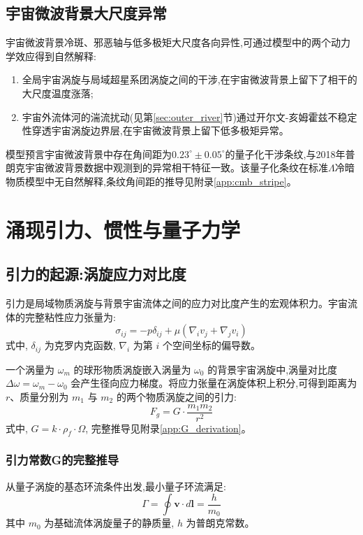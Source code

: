 \documentclass[11pt,a4paper]{article}
\def\grad{\nabla}
\begin{document}
\subsection{宇宙微波背景大尺度异常}
宇宙微波背景冷斑、邪恶轴与低多极矩大尺度各向异性,可通过模型中的两个动力学效应得到自然解释:
\begin{enumerate}
\item 全局宇宙涡旋与局域超星系团涡旋之间的干涉,在宇宙微波背景上留下了相干的大尺度温度涨落;
\item 宇宙外流体河的湍流扰动(见第\ref{sec:outer_river}节)通过开尔文-亥姆霍兹不稳定性穿透宇宙涡旋边界层,在宇宙微波背景上留下低多极矩异常。
\end{enumerate}

模型预言宇宙微波背景中存在角间距为$0.23^\circ\pm0.05^\circ$的量子化干涉条纹,与2018年普朗克宇宙微波背景数据中观测到的异常相干特征一致\cite{planck2019vi}。该量子化条纹在标准$\Lambda$冷暗物质模型中无自然解释,条纹角间距的推导见附录\ref{app:cmb_stripe}。

\section{涌现引力、惯性与量子力学}
\label{sec:gravity_origin}
\subsection{引力的起源:涡旋应力对比度}
引力是局域物质涡旋与背景宇宙流体之间的应力对比度产生的宏观体积力。宇宙流体的完整粘性应力张量为:
\begin{equation}
\sigma_{ij} = -p \delta_{ij} + \mu \left( \grad_i v_j + \grad_j v_i \right)
\end{equation}
式中, $\delta_{ij}$ 为克罗内克函数, $\grad_i$ 为第 $i$ 个空间坐标的偏导数。

一个涡量为 $\omega_m$ 的球形物质涡旋嵌入涡量为 $\omega_0$ 的背景宇宙涡旋中,涡量对比度 $\Delta\omega = \omega_m - \omega_0$ 会产生径向应力梯度。将应力张量在涡旋体积上积分,可得到距离为 $r$、质量分别为 $m_1$ 与 $m_2$ 的两个物质涡旋之间的引力:
\begin{equation}
F_g = G \cdot \frac{m_1 m_2}{r^2}
\end{equation}
式中, $G = k \cdot \rho_f \cdot \Omega$, 完整推导见附录\ref{app:G_derivation}。

\subsubsection{引力常数G的完整推导}
从量子涡旋的基态环流条件出发,最小量子环流满足:
\begin{equation}
\Gamma = \oint \boldsymbol{v} \cdot d\boldsymbol{l} = \frac{h}{m_0}
\end{equation}
其中 $m_0$ 为基础流体涡旋量子的静质量, $h$ 为普朗克常数。
\end{document}
